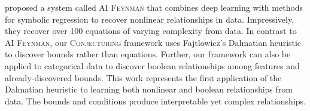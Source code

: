 \documentclass[ijds,nonblindrev]{informs-ijds}
\begin{document}



\citet{UdrescuTegmark20} proposed a system called \textsc{AI Feynman} that combines deep learning with methods for symbolic regression to recover nonlinear relationships in data.  Impressively, they recover over 100 equations of varying complexity from data.  In contrast to \textsc{AI Feynman}, our \textsc{Conjecturing} framework uses Fajtlowicz's Dalmatian heuristic \citep{Fajt95} to discover bounds rather than equations.  Further, our framework can also be applied to categorical data to discover boolean relationships among features and already-discovered bounds.  This work represents the first application of the Dalmatian heuristic to learning both nonlinear and boolean relationships from data.  The bounds and conditions produce interpretable yet complex relationships.

\end{document}
